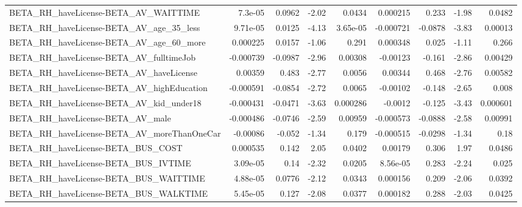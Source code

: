 \begin{tabular}{lrrrrrrrr}
BETA\_RH\_haveLicense-BETA\_AV\_WAITTIME               &     7.3e-05 &       0.0962 &    -2.02 &   0.0434 &   0.000215 &       0.233 &        -1.98 &        0.0482 \\
BETA\_RH\_haveLicense-BETA\_AV\_age\_35\_less            &    9.71e-05 &       0.0125 &    -4.13 & 3.65e-05 &  -0.000721 &     -0.0878 &        -3.83 &       0.00013 \\
BETA\_RH\_haveLicense-BETA\_AV\_age\_60\_more            &    0.000225 &       0.0157 &    -1.06 &    0.291 &   0.000348 &       0.025 &        -1.11 &         0.266 \\
BETA\_RH\_haveLicense-BETA\_AV\_fulltimeJob            &   -0.000739 &      -0.0987 &    -2.96 &  0.00308 &   -0.00123 &      -0.161 &        -2.86 &       0.00429 \\
BETA\_RH\_haveLicense-BETA\_AV\_haveLicense            &     0.00359 &        0.483 &    -2.77 &   0.0056 &    0.00344 &       0.468 &        -2.76 &       0.00582 \\
BETA\_RH\_haveLicense-BETA\_AV\_highEducation          &   -0.000591 &      -0.0854 &    -2.72 &   0.0065 &   -0.00102 &      -0.148 &        -2.65 &         0.008 \\
BETA\_RH\_haveLicense-BETA\_AV\_kid\_under18            &   -0.000431 &      -0.0471 &    -3.63 & 0.000286 &    -0.0012 &      -0.125 &        -3.43 &      0.000601 \\
BETA\_RH\_haveLicense-BETA\_AV\_male                   &   -0.000486 &      -0.0746 &    -2.59 &  0.00959 &  -0.000573 &     -0.0888 &        -2.58 &       0.00991 \\
BETA\_RH\_haveLicense-BETA\_AV\_moreThanOneCar         &    -0.00086 &       -0.052 &    -1.34 &    0.179 &  -0.000515 &     -0.0298 &        -1.34 &          0.18 \\
BETA\_RH\_haveLicense-BETA\_BUS\_COST                  &    0.000535 &        0.142 &     2.05 &   0.0402 &    0.00179 &       0.306 &         1.97 &        0.0486 \\
BETA\_RH\_haveLicense-BETA\_BUS\_IVTIME                &    3.09e-05 &         0.14 &    -2.32 &   0.0205 &   8.56e-05 &       0.283 &        -2.24 &         0.025 \\
BETA\_RH\_haveLicense-BETA\_BUS\_WAITTIME              &    4.88e-05 &       0.0776 &    -2.12 &   0.0343 &   0.000156 &       0.209 &        -2.06 &        0.0392 \\
BETA\_RH\_haveLicense-BETA\_BUS\_WALKTIME              &    5.45e-05 &        0.127 &    -2.08 &   0.0377 &   0.000182 &       0.288 &        -2.03 &        0.0425 \\

\end{tabular}
